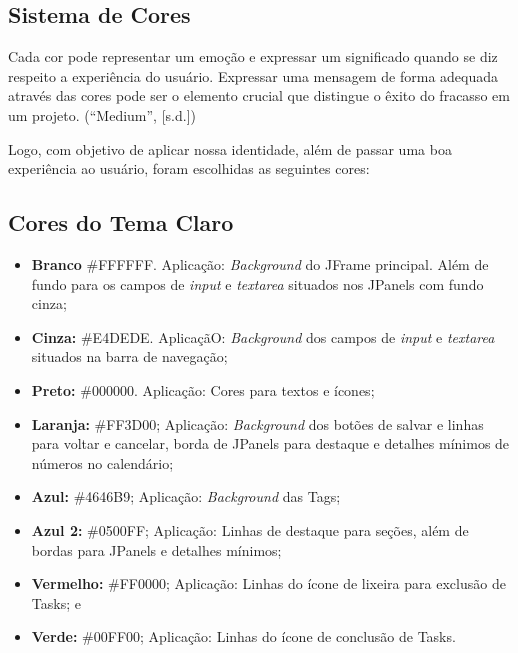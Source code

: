 \documentclass[a4paper,12pt]{article}
\begin{document}
\subsection{Sistema de Cores}
Cada cor pode representar um emoção e expressar um significado quando se diz respeito a experiência do usuário. Expressar uma 
mensagem de forma adequada através das cores pode ser o elemento crucial que distingue o êxito do fracasso em um projeto. (“Medium”, [s.d.])

Logo, com objetivo de aplicar nossa identidade, além de passar uma boa experiência ao usuário, foram escolhidas as seguintes cores:

\subsection{Cores do Tema Claro}
\begin{itemize}
	\item \textbf{Branco} \#FFFFFF. Aplicação: \textit{Background} do JFrame principal. Além de fundo para os campos de \textit{input} e \textit{textarea} 
	situados nos JPanels com fundo cinza;
	\item \textbf{Cinza:} \#E4DEDE. AplicaçãO: \textit{Background} dos campos de \textit{input} e \textit{textarea} situados na barra de navegação;
	\item \textbf{Preto:} \#000000. Aplicação: Cores para textos e ícones;
	\item \textbf{Laranja:} \#FF3D00; Aplicação: \textit{Background} dos botões de salvar e linhas para voltar e cancelar, borda de JPanels 
	para destaque e detalhes mínimos de números no calendário;
	\item \textbf{Azul:} \#4646B9; Aplicação: \textit{Background} das Tags;
	\item \textbf{Azul 2:} \#0500FF; Aplicação: Linhas de destaque para seções, além de bordas para JPanels e detalhes mínimos;
	\item \textbf{Vermelho:} \#FF0000; Aplicação: Linhas do ícone de lixeira para exclusão de Tasks; e
	\item \textbf{Verde:} \#00FF00; Aplicação: Linhas do ícone de conclusão de Tasks.
\end{itemize}
\end{document}
